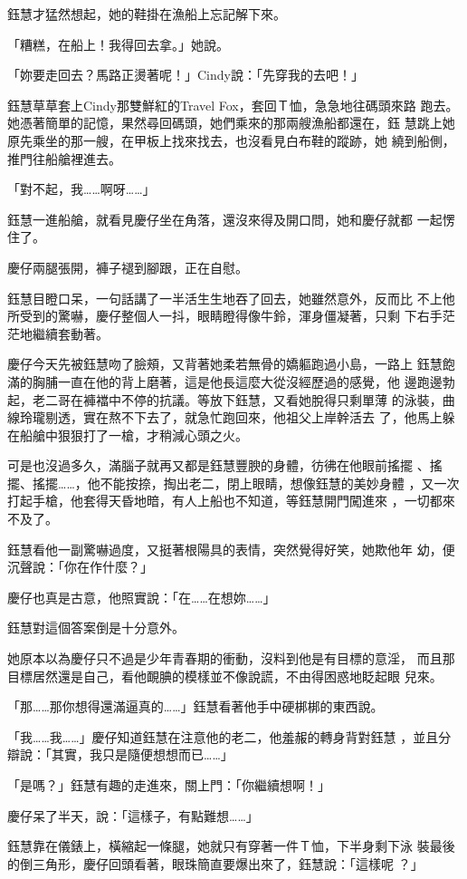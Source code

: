 鈺慧才猛然想起，她的鞋掛在漁船上忘記解下來。

「糟糕，在船上！我得回去拿。」她說。

「妳要走回去？馬路正燙著呢！」Cindy說：「先穿我的去吧！」

鈺慧草草套上Cindy那雙鮮紅的Travel Fox，套回Ｔ恤，急急地往碼頭來路
跑去。她憑著簡單的記憶，果然尋回碼頭，她們乘來的那兩艘漁船都還在，鈺
慧跳上她原先乘坐的那一艘，在甲板上找來找去，也沒看見白布鞋的蹤跡，她
繞到船側，推門往船艙裡進去。

「對不起，我……啊呀……」

鈺慧一進船艙，就看見慶仔坐在角落，還沒來得及開口問，她和慶仔就都
一起愣住了。

慶仔兩腿張開，褲子褪到腳跟，正在自慰。

鈺慧目瞪口呆，一句話講了一半活生生地吞了回去，她雖然意外，反而比
不上他所受到的驚嚇，慶仔整個人一抖，眼睛瞪得像牛鈴，渾身僵凝著，只剩
下右手茫茫地繼續套動著。

慶仔今天先被鈺慧吻了臉頰，又背著她柔若無骨的嬌軀跑過小島，一路上
鈺慧飽滿的胸脯一直在他的背上磨著，這是他長這麼大從沒經歷過的感覺，他
邊跑邊勃起，老二哥在褲襠中不停的抗議。等放下鈺慧，又看她脫得只剩單薄
的泳裝，曲線玲瓏剔透，實在熬不下去了，就急忙跑回來，他祖父上岸幹活去
了，他馬上躲在船艙中狠狠打了一槍，才稍減心頭之火。

可是也沒過多久，滿腦子就再又都是鈺慧豐腴的身體，彷彿在他眼前搖擺
、搖擺、搖擺……，他不能按捺，掏出老二，閉上眼睛，想像鈺慧的美妙身體
，又一次打起手槍，他套得天昏地暗，有人上船也不知道，等鈺慧開門闖進來
，一切都來不及了。

鈺慧看他一副驚嚇過度，又挺著根陽具的表情，突然覺得好笑，她欺他年
幼，便沉聲說：「你在作什麼？」

慶仔也真是古意，他照實說：「在……在想妳……」

鈺慧對這個答案倒是十分意外。

她原本以為慶仔只不過是少年青春期的衝動，沒料到他是有目標的意淫，
而且那目標居然還是自己，看他靦腆的模樣並不像說謊，不由得困惑地眨起眼
兒來。

「那……那你想得還滿逼真的……」鈺慧看著他手中硬梆梆的東西說。

「我……我……」慶仔知道鈺慧在注意他的老二，他羞赧的轉身背對鈺慧
，並且分辯說：「其實，我只是隨便想想而已……」

「是嗎？」鈺慧有趣的走進來，關上門：「你繼續想啊！」

慶仔呆了半天，說：「這樣子，有點難想……」

鈺慧靠在儀錶上，橫縮起一條腿，她就只有穿著一件Ｔ恤，下半身剩下泳
裝最後的倒三角形，慶仔回頭看著，眼珠簡直要爆出來了，鈺慧說：「這樣呢
？」

